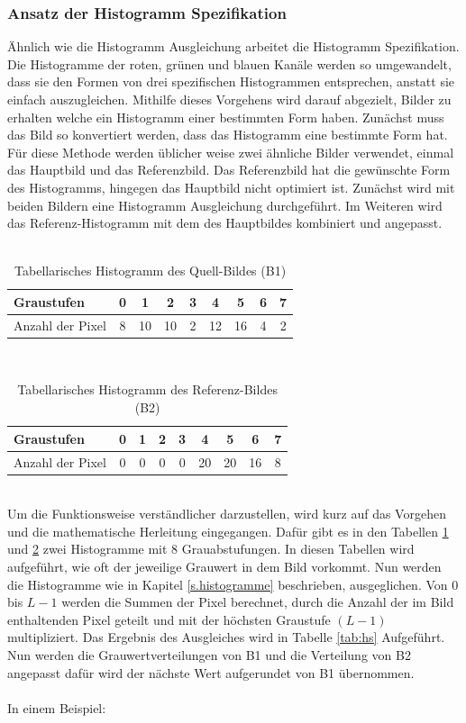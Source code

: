 \documentclass[a4paper,12pt,oneside]{article}
\begin{document}
  \subsubsection{Ansatz der Histogramm Spezifikation}\label{s.hs}
  Ähnlich wie die Histogramm Ausgleichung arbeitet die Histogramm Spezifikation. Die Histogramme der roten, grünen und blauen Kanäle werden so umgewandelt, dass sie den Formen von drei spezifischen Histogrammen entsprechen, anstatt sie einfach auszugleichen. Mithilfe dieses Vorgehens wird darauf abgezielt, Bilder zu erhalten welche ein Histogramm einer bestimmten Form haben. Zunächst muss das Bild so konvertiert werden, dass das Histogramm eine bestimmte Form hat.
  Für diese Methode werden üblicher weise zwei ähnliche Bilder verwendet, einmal das Hauptbild und das Referenzbild. Das Referenzbild hat die gewünschte Form des Histogramms, hingegen das Hauptbild nicht optimiert ist. Zunächst wird mit beiden Bildern eine Histogramm Ausgleichung durchgeführt. Im Weiteren wird das Referenz-Histogramm mit dem des Hauptbildes kombiniert und angepasst.\\\\
  \begin{table}
  [h]
  \caption{Tabellarisches Histogramm des Quell-Bildes (B1)}
  \label{tab:b1}
  \centering
  \begin{tabular}{|l|c|c|c|c|c|c|c|c|}
  \hline
  Graustufen & 0 & 1 & 2 & 3 & 4 & 5 & 6 & 7\\
  \hline
  Anzahl der Pixel & 8 & 10 & 10 & 2 & 12 & 16 & 4 & 2\\
  \hline
  \end{tabular}
  \end{table}\\
  \begin{table}
  [h]
  \caption{Tabellarisches Histogramm des Referenz-Bildes (B2)}
  \label{tab:b2}
  \centering
  \begin{tabular}{|l|c|c|c|c|c|c|c|c|}
  \hline
  Graustufen & 0 & 1 & 2 & 3 & 4 & 5 & 6 & 7\\
  \hline
  Anzahl der Pixel & 0 & 0 & 0 & 0 & 20 & 20 & 16 & 8\\
  \hline
  \end{tabular}
  \end{table}\\
  Um die Funktionsweise verständlicher darzustellen, wird kurz auf das Vorgehen und die mathematische Herleitung eingegangen. Dafür gibt es in den Tabellen \ref{tab:b1} und \ref{tab:b2} zwei Histogramme mit 8 Grauabstufungen. In diesen Tabellen wird aufgeführt, wie oft der jeweilige Grauwert in dem Bild vorkommt. Nun werden die Histogramme wie in Kapitel \ref{s.histogramme} beschrieben, ausgeglichen. Von 0 bis $L-1$ werden die Summen der Pixel berechnet, durch die Anzahl der im Bild enthaltenden Pixel geteilt und mit der höchsten Graustufe $(L-1)$ multipliziert. Das Ergebnis des Ausgleiches wird in Tabelle \ref{tab:hs} Aufgeführt. Nun werden die Grauwertverteilungen von B1 und die Verteilung von B2 angepasst dafür wird der nächste Wert aufgerundet von B1 übernommen.\\\\
  In einem Beispiel:
  
\end{document}
